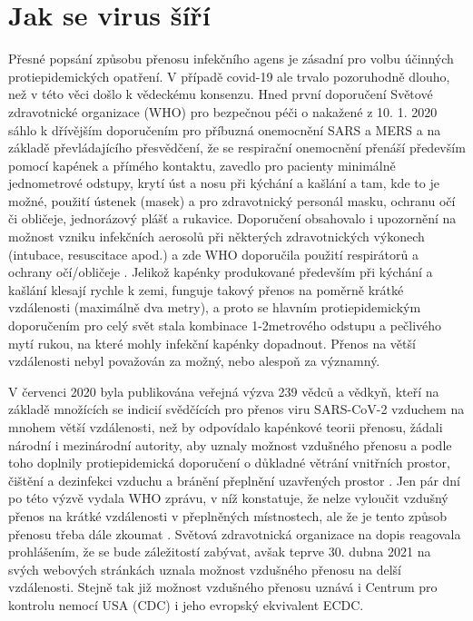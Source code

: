 \section*{Jak se virus šíří}
Přesné popsání způsobu přenosu infekčního agens je zásadní pro volbu účinných protiepidemických opatření. V případě covid-19 ale trvalo pozoruhodně dlouho, než v této věci došlo k vědeckému konsenzu. Hned první doporučení Světové zdravotnické organizace (WHO) pro bezpečnou péči o nakažené z 10. 1. 2020 sáhlo k dřívějším doporučením pro příbuzná onemocnění SARS a MERS \cite{WHO:2014} a na základě převládajícího přesvědčení, že se respirační onemocnění přenáší především pomocí kapének a přímého kontaktu, zavedlo pro pacienty minimálně jednometrové odstupy, krytí úst a nosu při kýchání a kašlání a tam, kde to je možné, použití ústenek (masek) a pro zdravotnický personál masku, ochranu očí či obličeje, jednorázový plášť a rukavice. Doporučení obsahovalo i upozornění na možnost vzniku infekčních aerosolů při některých zdravotnických výkonech (intubace, resuscitace apod.) a zde WHO doporučila použití respirátorů a ochrany očí/obličeje \cite{WHO:2020b}. Jelikož kapénky produkované především při kýchání a kašlání klesají rychle k zemi, funguje takový přenos na poměrně krátké vzdálenosti (maximálně dva metry), a proto se hlavním protiepidemickým doporučením pro celý svět stala kombinace 1-2metrového odstupu a pečlivého mytí rukou, na které mohly infekční kapénky dopadnout. Přenos na větší vzdálenosti nebyl považován za možný, nebo alespoň za významný.

V červenci 2020 byla publikována veřejná výzva 239 vědců a vědkyň, kteří na základě množících se indicií svědčících pro přenos viru SARS-CoV-2 vzduchem na mnohem větší vzdálenosti, než by odpovídalo kapénkové teorii přenosu, žádali národní i mezinárodní autority, aby uznaly možnost vzdušného přenosu a podle toho doplnily protiepidemická doporučení o důkladné větrání vnitřních prostor, čištění a dezinfekci vzduchu a bránění přeplnění uzavřených prostor \cite{Morawska:2020}. Jen pár dní po této výzvě vydala WHO zprávu, v níž konstatuje, že nelze vyloučit vzdušný přenos na krátké vzdálenosti v přeplněných místnostech, ale že je tento způsob přenosu třeba dále zkoumat \cite{WHO:2020c}. Světová zdravotnická organizace na dopis reagovala prohlášením, že se bude záležitostí zabývat, avšak teprve 30. dubna 2021 na svých webových stránkách uznala možnost vzdušného přenosu na delší vzdálenosti. Stejně tak již možnost vzdušného přenosu uznává i Centrum pro kontrolu nemocí USA (CDC) i jeho evropský ekvivalent ECDC.

